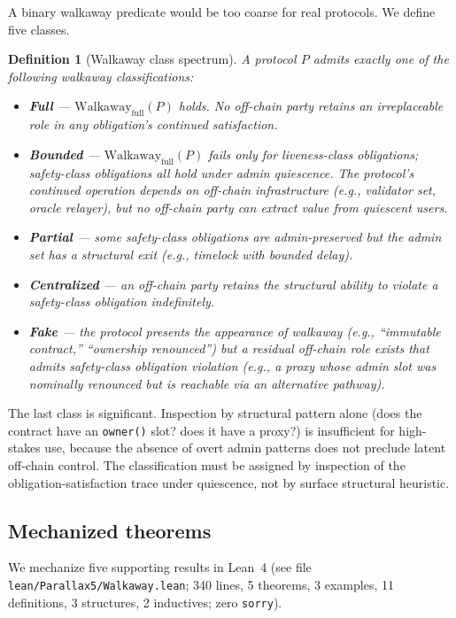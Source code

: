 \documentclass[11pt,a4paper]{article}
\newtheorem{definition}[theorem]{Definition}
\begin{document}
A binary walkaway predicate would be too coarse for real protocols. We define five classes.

\begin{definition}[Walkaway class spectrum]\label{def:walkaway-spectrum}
A protocol $P$ admits exactly one of the following \emph{walkaway classifications}:
\begin{itemize}
  \item \textbf{Full} --- $\mathrm{Walkaway}_{\mathrm{full}}(P)$ holds. No off-chain party retains an irreplaceable role in any obligation's continued satisfaction.
  \item \textbf{Bounded} --- $\mathrm{Walkaway}_{\mathrm{full}}(P)$ fails only for liveness-class obligations; safety-class obligations all hold under admin quiescence. The protocol's continued operation depends on off-chain infrastructure (e.g., validator set, oracle relayer), but no off-chain party can extract value from quiescent users.
  \item \textbf{Partial} --- some safety-class obligations are admin-preserved but the admin set has a structural exit (e.g., timelock with bounded delay).
  \item \textbf{Centralized} --- an off-chain party retains the structural ability to violate a safety-class obligation indefinitely.
  \item \textbf{Fake} --- the protocol presents the appearance of walkaway (e.g., ``immutable contract,'' ``ownership renounced'') but a residual off-chain role exists that admits safety-class obligation violation (e.g., a proxy whose admin slot was nominally renounced but is reachable via an alternative pathway).
\end{itemize}
\end{definition}

The last class is significant. Inspection by structural pattern alone (does the contract have an \texttt{owner()} slot? does it have a proxy?) is insufficient for high-stakes use, because the absence of overt admin patterns does not preclude latent off-chain control. The classification must be assigned by inspection of the obligation-satisfaction trace under quiescence, not by surface structural heuristic.

\subsection{Mechanized theorems}

We mechanize five supporting results in Lean~4 (see file \texttt{lean/Parallax5/Walkaway.lean}; 340 lines, 5 theorems, 3 examples, 11 definitions, 3 structures, 2 inductives; zero \texttt{sorry}).
\end{document}
